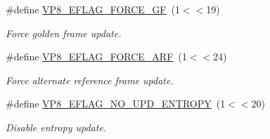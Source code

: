 \begin{DoxyCompactItemize}
\#define \hyperlink{group__vp8__encoder_gacb64c00adcb361f72a9a3028eb12f5ff}{V\+P8\+\_\+\+E\+F\+L\+A\+G\+\_\+\+F\+O\+R\+C\+E\+\_\+\+G\+F}~(1$<$$<$19)
\begin{DoxyCompactList}\small\item\em Force golden frame update. \end{DoxyCompactList}\item 
\#define \hyperlink{group__vp8__encoder_ga50584fe4bdb62ff935347576539650b7}{V\+P8\+\_\+\+E\+F\+L\+A\+G\+\_\+\+F\+O\+R\+C\+E\+\_\+\+A\+R\+F}~(1$<$$<$24)
\begin{DoxyCompactList}\small\item\em Force alternate reference frame update. \end{DoxyCompactList}\item 
\#define \hyperlink{group__vp8__encoder_ga5b91ad179910d4efc23aef66c7b2148b}{V\+P8\+\_\+\+E\+F\+L\+A\+G\+\_\+\+N\+O\+\_\+\+U\+P\+D\+\_\+\+E\+N\+T\+R\+O\+P\+Y}~(1$<$$<$20)
\begin{DoxyCompactList}\small\item\em Disable entropy update. \end{DoxyCompactList}\end{DoxyCompactItemize}

